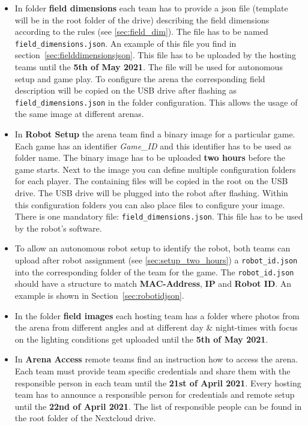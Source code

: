 \begin{itemize}
    \item In folder \textbf{field dimensions} each team has to provide a json file (template will be in the root folder of the drive) describing the field dimensions according to the rules (see \ref{sec:field_dim}). The file has to be named \texttt{field\_dimensions.json}. An example of this file you find in section~\ref{sec:fielddimensionsjson}. This file has to be uploaded by the hosting teams until the \textbf{5th of May 2021}. The file will be used for autonomous setup and game play. To configure the arena the corresponding field description will be copied on the USB drive after flashing as \texttt{field\_dimensions.json} in the folder configuration. This allows the usage of the same image at different arenas.
    \item In \textbf{Robot Setup} the arena team find a binary image for a particular game. Each game has an identifier \textit{Game\_ID} and this identifier has to be used as folder name. The binary image has to be uploaded \textbf{two hours} before the game starts. Next to the image you can define multiple configuration folders for each player. The containing files will be copied in the root on the USB drive. The USB drive will be plugged into the robot after flashing. Within this configuration folders you can also place files to configure your image. There is one mandatory file: \texttt{field\_dimensions.json}. This file has to be used by the robot's software.
    \item To allow an autonomous robot setup to identify the robot, both teams can upload after robot assignment (see \ref{sec:setup_two_hours}) a \texttt{robot\_id.json} into the corresponding folder of the team for the game. The \texttt{robot\_id.json} should have a structure to match \textbf{MAC-Address}, \textbf{IP} and \textbf{Robot ID}. An example is shown in Section~\ref{sec:robotidjson}.
    \item In the folder \textbf{field images} each hosting team has a folder where photos from the arena from different angles and at different day \& night-times with focus on the lighting conditions get uploaded until the \textbf{5th of May 2021}.
    \item In \textbf{Arena Access} remote teams find an instruction how to access the arena. Each team must provide team specific credentials and share them with the responsible person in each team until the \textbf{21st of April 2021}. Every hosting team has to announce a responsible person for credentials and remote setup until the \textbf{22nd of April 2021}. The list of responsible people can be found in the root folder of the Nextcloud drive.

\end{itemize}
